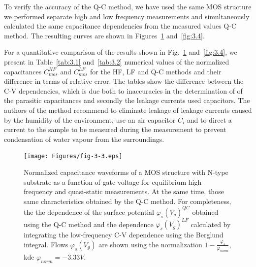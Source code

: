 To verify the accuracy of the Q-C method, we have used the same MOS
structure we performed separate high and low frequency measurements
and simultaneously calculated the same capacitance dependencies from
the measured values Q-C method.  The resulting curves are shown in
Figures~\ref{fig:3.3} and~\ref{fig:3.4}.

For a quantitative comparison of the results shown in
Fig.~\ref{fig:3.3} and~\ref{fig:3.4}, we present in
Table~\ref{tab:3.1} and~\ref{tab:3.2} numerical values of the
normalized capacitances $C^{HF}_{mos}$ and $C^{LF}_{mos}$ for the HF,
LF and Q-C methods and their difference in terms of relative
error. The tables show the difference between the C-V dependencies,
which is due both to inaccuracies in the determination of of the
parasitic capacitances and secondly the leakage currents used
capacitors. The authors of the method recommend to eliminate leakage
of leakage currents caused by the humidity of the environment, use an
air capacitor $C_i$ and to direct a current to the sample to be
measured during the measurement to prevent condensation of water
vapour from the surroundings.

\newpage
\begin{figure}[h!]\centering
  \texttt{[image: Figures/fig-3-3.eps]}
  \caption[Normalized capacitance waveforms of MOS structure with substrate type
  N as a function of gate voltage for equilibrium high-frequency and
  quasi-static measurements]{Normalized capacitance waveforms of a MOS structure with
  N-type substrate as a function of gate voltage for equilibrium
  high-frequency and quasi-static measurements.  At the same time, those
  same characteristics obtained by the Q-C method. For completeness, the
  the dependence of the surface potential
  ${\varphi_s(V_g)}^{QC}$ obtained using the Q-C method and the dependence
  ${\varphi_s(V_g)}^{LF}$ calculated by integrating the low-frequency C-V
  dependence using the Berglund integral.  Flows
  $\varphi_s(V_g)$ are shown using the normalization $1-\frac{\varphi_s}{\varphi_{norm}}$, kde $\varphi_{norm}=-3.33V$.}\label{fig:3.3}
\end{figure}

